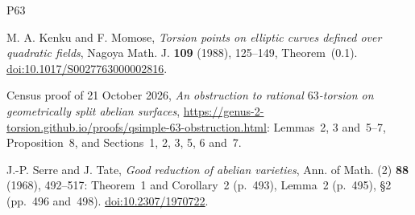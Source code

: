 \documentclass[11pt]{article}
\begin{document}
\begin{thebibliography}{P63}

M. A. Kenku and F. Momose, \emph{Torsion points on elliptic curves defined over quadratic fields},
Nagoya Math. J. \textbf{109} (1988), 125--149, Theorem~(0.1).
\href{https://doi.org/10.1017/S0027763000002816}{doi:10.1017/S0027763000002816}.

Census proof of 21 October 2026, \emph{An obstruction to rational \(63\)-torsion on geometrically
split abelian surfaces},
\url{https://genus-2-torsion.github.io/proofs/qsimple-63-obstruction.html}: Lemmas~2, 3
and~5--7, Proposition~8, and Sections~1, 2, 3, 5, 6 and~7.

J.-P. Serre and J. Tate, \emph{Good reduction of abelian varieties}, Ann. of Math. (2)
\textbf{88} (1968), 492--517: Theorem~1 and Corollary~2 (p.~493), Lemma~2 (p.~495), \S2
(pp.~496 and~498). \href{https://doi.org/10.2307/1970722}{doi:10.2307/1970722}.

\end{thebibliography}
\end{document}

